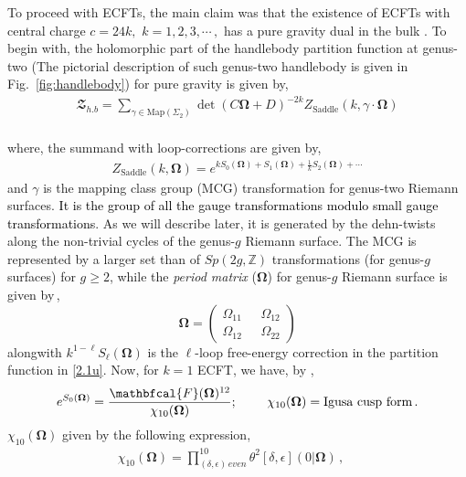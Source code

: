 \documentclass[12 pt]{article}
\begin{document}
\noindent
To proceed with ECFTs, the main claim was that the existence of ECFTs with central charge $c=24k,\,\, k=1,2,3,\cdots\,,$ has a pure gravity dual in the bulk \cite{Yin:2007gv}. To begin with, the holomorphic part of the handlebody partition function at genus-two (The pictorial description of such genus-two handlebody is given in Fig.~\eqref{fig:handlebody}) for pure gravity is given by,
\begin{align}
    \mathbfcal{Z}_{h.b}=\sum_{\gamma\in \textrm{Map}(\Sigma_2)}\det(C\mathbf{\Omega}+D)^{-2k} Z_{\text{Saddle}}(k,\gamma\cdot \mathbf{\Omega})\label{2.1u}
\end{align}\\
where, the summand with loop-corrections are given by,
\begin{align}
    Z_{\text{Saddle}}(k, \mathbf{\Omega})=e^{kS_0(\mathbf\Omega)+S_1(\mathbf\Omega)+\frac{1}{k}S_2(\mathbf\Omega)+\cdots}\label{2.2u}
\end{align}
and $\gamma$ is the mapping class group (MCG) transformation for genus-two Riemann surfaces. \textcolor{black}{It is the group of all the gauge transformations modulo small gauge transformations}. As we will describe later, it is generated by the dehn-twists along the non-trivial cycles of the genus-$g$ Riemann surface. The MCG is represented by a larger set than of $Sp(2g,\mathbb{Z})$ transformations (for genus-$g$ surfaces) for $g\geq2$, while the \textit{period matrix} ($\mathbf{\Omega}$) for genus-$g$ Riemann surface is given by\,, \begin{equation}
    \mathbf\Omega=
    \begin{pmatrix}
     \Omega_{11} &\,\,\,\, \Omega_{12}\\
    \Omega_{12} &\,\,\,\,\Omega_{22}
    \end{pmatrix}
    \label{2.3r}
\end{equation}
alongwith $k^{1-\ell}S_{\ell}(\mathbf{\Omega})$ is the $\ell$-loop free-energy correction in the partition function in \eqref{2.1u}. Now, for $k=1$  ECFT, we have, by \cite{Yin:2007gv},
\begin{align}
    \begin{split}
    e^{S_0(\mathbf{\Omega})}=\frac{\mathbfcal{F}(\mathbf \Omega)^{12}}{\chi_{10}(\mathbf \Omega)};\,\,\,\,\,\,\,\,\,\,\,\,\,\, \chi_{10}(\mathbf \Omega)=\text{Igusa cusp form\,.}
    \end{split}
\end{align}
$\chi_{10}(\mathbf{\Omega})$ given by the following expression,
\begin{align}
  \chi_{10}(\mathbf{\Omega})=\prod_{(\delta,\epsilon)\,even}^{10}\theta^2[\delta,\epsilon](0|\mathbf{\Omega})\,, \quad
\end{align}
\end{document}
